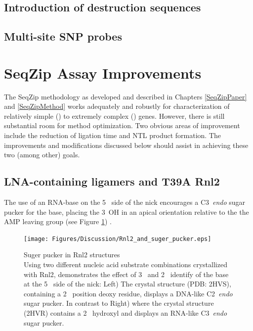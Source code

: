   \subsection{Introduction of destruction sequences}


  \subsection{Multi-site SNP probes}


\section{SeqZip Assay Improvements}

  The SeqZip methodology as developed and described in Chapters \ref{SeqZipPaper} and \ref{SeqZipMethod} works adequately and robustly for characterization of relatively simple (\cd{}) to extremely complex (\dscam{}) genes. However, there is still substantial room for method optimization. Two obvious areas of improvement include the reduction of ligation time and NTL product formation. The improvements and modifications discussed below should assist in achieving these two (among other) goals.

  \subsection{LNA-containing ligamers and T39A Rnl2} 

    The use of an RNA-base on the 5\textprime~ side of the nick encourages a C3\textprime~\textit{endo} sugar pucker for the base, placing the 3\textprime~OH in an apical orientation relative to the the AMP leaving group (see Figure \ref{fig:Rnl2 and suger pucker}) \citep{Nandakumar2006}.

    \begin{figure}[htbp] %
      \centering 
      \texttt{[image: Figures/Discussion/Rnl2\_and\_suger\_pucker.eps]}
      \caption[Suger pucker in Rnl2 structures]
      {Suger pucker in Rnl2 structures \\
        Using two different nucleic acid substrate combinations crystallized with Rnl2, \citet{Nandakumar2006} demonstrates the effect of 3\textprime~ and 2\textprime~ identify of the base at the 5\textprime~ side of the nick: Left) The crystal structure (PDB: 2HVS), containing a 2\textprime~ position deoxy residue, displays a DNA-like C2\textprime~\textit{endo} sugar pucker. In contrast to Right) where the crystal structure (2HVR) contains a 2\textprime~ hydroxyl and displays an RNA-like C3\textprime~\textit{endo} sugar pucker.
        }
        \label{fig:Rnl2 and suger pucker}
        \end{figure}

